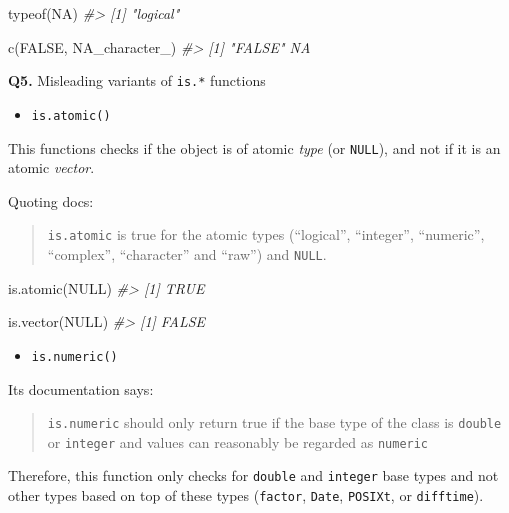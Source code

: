 \documentclass[
]{book}
\newenvironment{Shaded}{\begin{snugshade}}{\end{snugshade}}
\newcommand{\CommentTok}[1]{\textcolor[rgb]{0.56,0.35,0.01}{\textit{#1}}}
\newcommand{\ConstantTok}[1]{\textcolor[rgb]{0.00,0.00,0.00}{#1}}
\newcommand{\FunctionTok}[1]{\textcolor[rgb]{0.00,0.00,0.00}{#1}}
\newcommand{\NormalTok}[1]{#1}
\providecommand{\tightlist}{%
  \setlength{\itemsep}{0pt}\setlength{\parskip}{0pt}}
\begin{document}
\begin{Shaded}
\begin{Highlighting}[]
\FunctionTok{typeof}\NormalTok{(}\ConstantTok{NA}\NormalTok{)}
\CommentTok{\#\textgreater{} [1] "logical"}

\FunctionTok{c}\NormalTok{(}\ConstantTok{FALSE}\NormalTok{, }\ConstantTok{NA\_character\_}\NormalTok{)}
\CommentTok{\#\textgreater{} [1] "FALSE" NA}
\end{Highlighting}
\end{Shaded}

\textbf{Q5.} Misleading variants of \texttt{is.*} functions

\begin{itemize}
\tightlist
\item
  \texttt{is.atomic()}
\end{itemize}

This functions checks if the object is of atomic \emph{type} (or \texttt{NULL}), and not if it is an atomic \emph{vector}.

Quoting docs:

\begin{quote}
\texttt{is.atomic} is true for the atomic types (``logical'', ``integer'', ``numeric'', ``complex'', ``character'' and ``raw'') and \texttt{NULL}.
\end{quote}

\begin{Shaded}
\begin{Highlighting}[]
\FunctionTok{is.atomic}\NormalTok{(}\ConstantTok{NULL}\NormalTok{)}
\CommentTok{\#\textgreater{} [1] TRUE}

\FunctionTok{is.vector}\NormalTok{(}\ConstantTok{NULL}\NormalTok{)}
\CommentTok{\#\textgreater{} [1] FALSE}
\end{Highlighting}
\end{Shaded}

\begin{itemize}
\tightlist
\item
  \texttt{is.numeric()}
\end{itemize}

Its documentation says:

\begin{quote}
\texttt{is.numeric} should only return true if the base type of the class is \texttt{double} or \texttt{integer} and values can reasonably be regarded as \texttt{numeric}
\end{quote}

Therefore, this function only checks for \texttt{double} and \texttt{integer} base types and not other types based on top of these types (\texttt{factor}, \texttt{Date}, \texttt{POSIXt}, or \texttt{difftime}).
\end{document}
